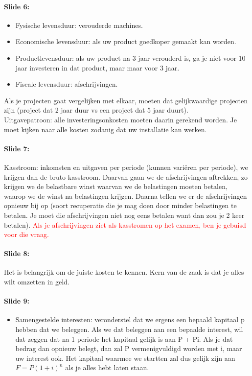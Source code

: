 \documentclass[10pt,a4paper]{report}
\begin{document}
\paragraph{Slide 6:}
\begin{itemize}
\item Fysische levensduur: verouderde machines.
\item Economische levensduur: als uw product goedkoper gemaakt kan worden.
\item Productlevensduur: als uw product na 3 jaar verouderd is, ga je niet voor 10 jaar investeren in dat product, maar maar voor 3 jaar.
\item Fiscale levensduur: afschrijvingen.
\end{itemize}
Als je projecten gaat vergelijken met elkaar, moeten dat gelijkwaardige projecten zijn (project dat 2 jaar duur vs een project dat 5 jaar duurt). \\
Uitgavepatroon: alle investeringsonkosten moeten daarin gerekend worden. Je moet kijken naar alle kosten zodanig dat uw installatie kan werken.

\paragraph{Slide 7:} Kasstroom: inkomsten en uitgaven per periode (kunnen vari\"eren per periode), we krijgen dan de bruto kasstroom. Daarvan gaan we de afschrijvingen aftrekken, zo krijgen we de belastbare winst waarvan we de belastingen moeten betalen, waarop we de winst na belastingen krijgen. Daarna tellen we er de afschrijvingen opnieuw bij op (soort recuperatie die je mag doen door minder belastingen te betalen. Je moet die afschrijvingen niet nog eens betalen want dan zou je 2 keer betalen). \textcolor{red}{Als je afschrijvingen ziet als kasstromen op het examen, ben je gebuisd voor die vraag.}

\paragraph{Slide 8:} Het is belangrijk om de juiste kosten te kennen. Kern van de zaak is dat je alles wilt omzetten in geld.

\paragraph{Slide 9:}
\begin{itemize}
\item Samengestelde interesten: veronderstel dat we ergens een bepaald kapitaal p hebben dat we beleggen. Als we dat beleggen aan een bepaalde interest, wil dat zeggen dat na 1 periode het kapitaal gelijk is aan P + Pi. Als je dat bedrag dan opnieuw belegt, dan zal P vermenigvuldigd worden met i, maar uw interest ook. Het kapitaal waarmee we startten zal dus gelijk zijn aan $F = P(1+i)^{n}$ als je alles hebt laten staan.
\end{itemize}
\end{document}
